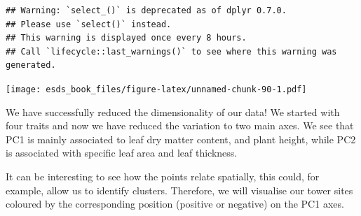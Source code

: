 \documentclass[
]{book}
\newenvironment{Shaded}{\begin{snugshade}}{\end{snugshade}}
\newcommand{\CommentTok}[1]{\textcolor[rgb]{0.56,0.35,0.01}{\textit{#1}}}
\newcommand{\DecValTok}[1]{\textcolor[rgb]{0.00,0.00,0.81}{#1}}
\newcommand{\NormalTok}[1]{#1}
\newcommand{\OperatorTok}[1]{\textcolor[rgb]{0.81,0.36,0.00}{\textbf{#1}}}
\newcommand{\StringTok}[1]{\textcolor[rgb]{0.31,0.60,0.02}{#1}}
\begin{document}
\begin{verbatim}
## Warning: `select_()` is deprecated as of dplyr 0.7.0.
## Please use `select()` instead.
## This warning is displayed once every 8 hours.
## Call `lifecycle::last_warnings()` to see where this warning was generated.
\end{verbatim}

\texttt{[image: esds\_book\_files/figure-latex/unnamed-chunk-90-1.pdf]}

We have successfully reduced the dimensionality of our data! We started with four traits and now we have reduced the variation to two main axes. We see that PC1 is mainly associated to leaf dry matter content, and plant height, while PC2 is associated with specific leaf area and leaf thickness.

It can be interesting to see how the points relate spatially, this could, for example, allow us to identify clusters. Therefore, we will visualise our tower sites coloured by the corresponding position (positive or negative) on the PC1 axes.

\begin{Shaded}
\end{Shaded}
\end{document}
